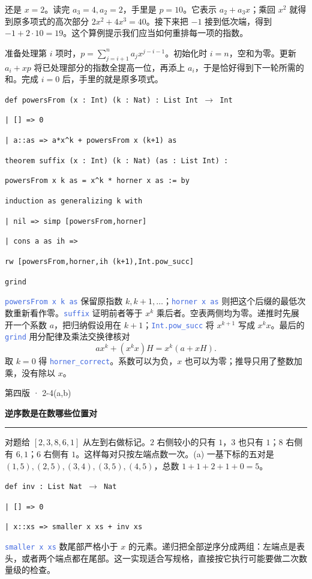 \documentclass[UTF8,11pt,a4paper,fontset=fandol]{ctexart}
\newcommand{\HandoutLesson}[2]{%
  \par{\small\heiti\color{BrickRed}#1}\par\vspace{3pt}
  {\fontsize{21}{27}\selectfont\heiti\bfseries #2}\par
  \textcolor{BrickRed}{\rule{\linewidth}{.7pt}}\par}
\newcommand{\src}[1]{\textcolor{RoyalBlue}{\texttt{#1}}}
\newcommand{\subhead}[1]{\par\vspace{3pt}{\heiti\bfseries\color{RoyalBlue}#1}\par}
\newenvironment{leanblock}{\par\smallskip\noindent\begin{lrbox}{\leanbox}\begin{minipage}{\dimexpr\linewidth-12pt\relax}\raggedright\small\setlength{\parskip}{0pt}}{\end{minipage}\end{lrbox}\colorbox{RoyalBlue!6}{\usebox{\leanbox}}\par\smallskip}
\newcommand{\lineofcode}[2]{\noindent\hspace*{#1em}\strut\texttt{#2}\par}
\begin{document}
还是 $x=2$。读完 $a_3=4,a_2=2$，手里是 $p=10$。它表示 $a_2+a_3x$；乘回 $x^2$ 就得到原多项式的高次部分 $2x^2+4x^3=40$。接下来把 $-1$ 接到低次端，得到 $-1+2\cdot10=19$。这个算例提示我们应当如何重排每一项的指数。
\subhead{写出循环不变量}
准备处理第 $i$ 项时，$p=\sum_{j=i+1}^{n}a_jx^{j-i-1}$。初始化时 $i=n$，空和为零。更新 $a_i+xp$ 将已处理部分的指数全提高一位，再添上 $a_i$，于是恰好得到下一轮所需的和。完成 $i=0$ 后，手里的就是原多项式。
\begin{leanblock}
\lineofcode{0.0}{def powersFrom (x : Int) (k : Nat) : List Int \ensuremath{\to} Int}
\lineofcode{0.9}{| [] => 0}
\lineofcode{0.9}{| a::as => a*x\textasciicircum{}k + powersFrom x (k+1) as}
\end{leanblock}
\begin{leanblock}
\lineofcode{0.0}{theorem suffix (x : Int) (k : Nat) (as : List Int) :}
\lineofcode{1.8}{powersFrom x k as = x\textasciicircum{}k * horner x as := by}
\lineofcode{0.9}{induction as generalizing k with}
\lineofcode{0.9}{| nil => simp [powersFrom,horner]}
\lineofcode{0.9}{| cons a as ih =>}
\lineofcode{1.8}{rw [powersFrom,horner,ih (k+1),Int.pow\_succ]}
\lineofcode{1.8}{grind}
\end{leanblock}
\src{powersFrom x k as} 保留原指数 $k,k+1,\dots$；\src{horner x as} 则把这个后缀的最低次数重新看作零。\src{suffix} 证明前者等于 $x^k$ 乘后者。空表两侧均为零。递推时先展开一个系数 $a$，把归纳假设用在 $k+1$；\src{Int.pow\_succ} 将 $x^{k+1}$ 写成 $x^kx$。最后的 \src{grind} 用分配律及乘法交换律核对
\[
 a x^k + (x^kx)H=x^k(a+xH).
\]
取 $k=0$ 得 \src{horner\_correct}。系数可以为负，$x$ 也可以为零；推导只用了整数加乘，没有除以 $x$。
\par{}
\clearpage{}\label{p47}\HandoutLesson{第四版 · 2-4(a,b)}{逆序数是在数哪些位置对}
对题给 $[2,3,8,6,1]$ 从左到右做标记。$2$ 右侧较小的只有 $1$，$3$ 也只有 $1$；$8$ 右侧有 $6,1$；$6$ 右侧有 $1$。这样每对只按左端点数一次。(a) 一基下标的五对是 $(1,5),(2,5),(3,4),(3,5),(4,5)$，总数 $1+1+2+1+0=5$。
\begin{leanblock}
\lineofcode{0.0}{def inv : List Nat \ensuremath{\to} Nat}
\lineofcode{0.9}{| [] => 0}
\lineofcode{0.9}{| x::xs => smaller x xs + inv xs}
\end{leanblock}
\src{smaller x xs} 数尾部严格小于 $x$ 的元素。递归把全部逆序分成两组：左端点是表头，或者两个端点都在尾部。这一实现适合写规格，直接按它执行可能要做二次数量级的检查。
\subhead{(b) 怎样达到最大值}
\end{document}
